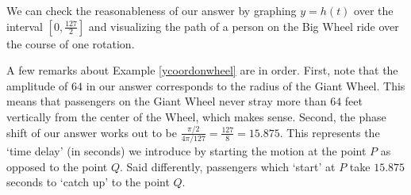 \documentclass{ximera}
\begin{document}
\begin{example}
\begin{explanation}
We can check the reasonableness of our answer by graphing $y = h(t)$ over the interval $\left[0, \frac{127}{2}\right]$ and visualizing the path of a person on the Big Wheel ride over the course of one rotation.

\begin{image}

\end{image}

\end{explanation}
\end{example}

A few remarks about Example \ref{ycoordonwheel} are in order.  First, note that the amplitude of $64$ in our answer corresponds to the radius of the Giant Wheel.  This means that passengers on the Giant Wheel never stray more than $64$ feet vertically from the center of the Wheel, which makes sense.  Second, the phase shift of our answer works out to be $\frac{\pi/2}{4\pi/127} = \frac{127}{8} = 15.875$.  This represents the `time delay' (in seconds) we introduce by starting the motion at the point $P$ as opposed to the point $Q$.  Said differently, passengers which `start' at $P$ take  $15.875$ seconds to `catch up' to the point $Q$.  
\end{document}
